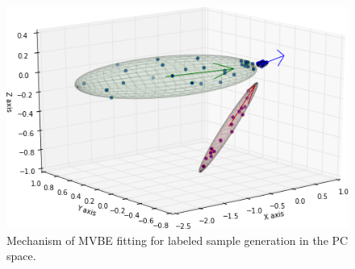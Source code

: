 \begin{figure}[tbhp]
\centering
\includegraphics[width=0.8\columnwidth]{Figures/CD/3d}
\caption{Mechanism of MVBE fitting for labeled sample generation in the PC space.}
\label{fig:MVE}
\end{figure}

